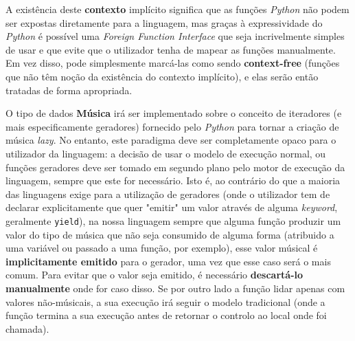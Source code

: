 \documentclass[
  oneside,
  11pt, a4paper,
  footinclude=true,
  headinclude=true,
  cleardoublepage=empty
]{scrbook}
\begin{document}
	A existência deste \textbf{contexto} implícito significa que as funções \textit{Python} não podem ser expostas diretamente para a linguagem, mas graças à expressividade do \textit{Python} é possível uma \textit{Foreign Function Interface} que seja incrivelmente simples de usar e que evite que o utilizador tenha de mapear as funções manualmente. Em vez disso, pode simplesmente marcá-las como sendo \textbf{context-free} (funções que não têm noção da existência do contexto implícito), e elas serão então tratadas de forma apropriada.
	
	O tipo de dados \textbf{Música} irá ser implementado sobre o conceito de iteradores (e mais especificamente geradores) fornecido pelo \textit{Python} para tornar a criação de música \textit{lazy}. No entanto, este paradigma deve ser completamente opaco para o utilizador da linguagem: a decisão de usar o modelo de execução normal, ou funções geradores deve ser tomado em segundo plano pelo motor de execução da linguagem, sempre que este for necessário. Isto é, ao contrário do que a maioria das linguagens exige para a utilização de geradores (onde o utilizador tem de declarar explicitamente que quer "emitir" um valor através de alguma \textit{keyword}, geralmente \texttt{yield}), na nossa linguagem sempre que alguma função produzir um valor do tipo de música que não seja consumido de alguma forma (atribuido a uma variável ou passado a uma função, por exemplo), esse valor músical é \textbf{implicitamente emitido} para o gerador, uma vez que esse caso será o mais comum. Para evitar que o valor seja emitido, é necessário \textbf{descartá-lo manualmente} onde for caso disso. Se por outro lado a função lidar apenas com valores não-músicais, a sua execução irá seguir o modelo tradicional (onde a função termina a sua execução antes de retornar o controlo ao local onde foi chamada).
    \newpage
\end{document}
